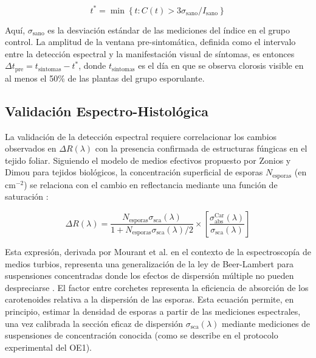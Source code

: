 \documentclass[12pt, a4paper]{article}
\begin{document}
	\begin{equation}
		t^* = \min \left\{ t : C(t) > 3\sigma_{\text{sano}} / I_{\text{sano}} \right\}
		\label{eq:dia_deteccion}
	\end{equation}
	
	Aquí, $\sigma_{\text{sano}}$ es la desviación estándar de las mediciones del índice en el grupo control. La amplitud de la ventana pre-sintomática, definida como el intervalo entre la detección espectral y la manifestación visual de síntomas, es entonces $\Delta t_{\text{pre}} = t_{\text{síntomas}} - t^*$, donde $t_{\text{síntomas}}$ es el día en que se observa clorosis visible en al menos el 50\% de las plantas del grupo esporulante.
	
	\subsection{Validación Espectro-Histológica}
	
	La validación de la detección espectral requiere correlacionar los cambios observados en $\Delta R(\lambda)$ con la presencia confirmada de estructuras fúngicas en el tejido foliar. Siguiendo el modelo de medios efectivos propuesto por Zonios y Dimou para tejidos biológicos, la concentración superficial de esporas $N_{\text{esporas}}$ (en cm$^{-2}$) se relaciona con el cambio en reflectancia mediante una función de saturación \parencite{Zonios2006}:
	
	\begin{equation}
		\Delta R(\lambda) = \frac{N_{\text{esporas}} \sigma_{\text{sca}}(\lambda)}{1 + N_{\text{esporas}} \sigma_{\text{sca}}(\lambda) / 2} \times \left[ \frac{\sigma_{\text{abs}}^{\text{Car}}(\lambda)}{\sigma_{\text{sca}}(\lambda)} \right]
		\label{eq:delta_r_esporas}
	\end{equation}
	
	Esta expresión, derivada por Mourant et al. en el contexto de la espectroscopía de medios turbios, representa una generalización de la ley de Beer-Lambert para suspensiones concentradas donde los efectos de dispersión múltiple no pueden despreciarse \parencite{Mourant1997}. El factor entre corchetes representa la eficiencia de absorción de los carotenoides relativa a la dispersión de las esporas. Esta ecuación permite, en principio, estimar la densidad de esporas a partir de las mediciones espectrales, una vez calibrada la sección eficaz de dispersión $\sigma_{\text{sca}}(\lambda)$ mediante mediciones de suspensiones de concentración conocida (como se describe en el protocolo experimental del OE1).
	
\end{document}
